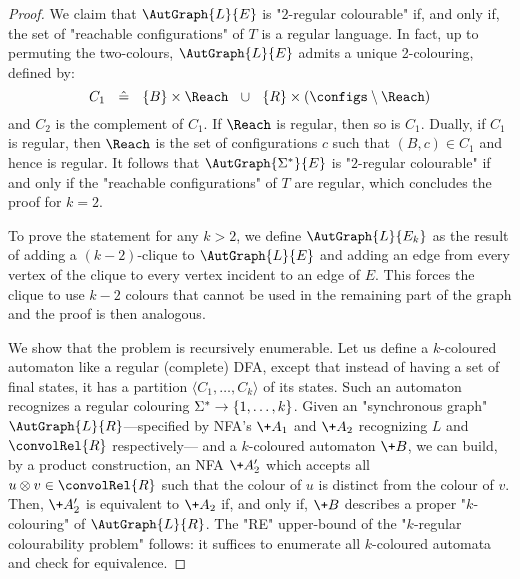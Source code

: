 \begin{proof}
    We claim that $\AutGraph{L}{E}$ is "$2$-regular colourable" if, and only if, the set of "reachable configurations" of $T$ is a regular language. 
    In fact, up to permuting the two-colours, 
  $\AutGraph{L}{E}$ admits a unique 2-colouring, defined by:
    \[
        C_1 ~~ \defeq ~~ \{B\} \times \Reach ~~\cup~~ \{R\} \times (\configs \setminus \Reach)
    \]
    and $C_2$ is the complement of $C_1$.
    If $\Reach$ is regular, then so is $C_1$. Dually, if $C_1$ is regular, then
    $\Reach$ is the set of configurations $c$ such that $(B,c) \in C_1$ and hence is regular.
    It follows that $\AutGraph{\Sigma^*}{E}$ is "$2$-regular colourable" if and only if
    the "reachable configurations" of $T$ are regular, which concludes the proof for $k=2$.



    To prove the statement for any $k>2$, we define $\AutGraph{L}{E_k}$ as the result of adding a $(k-2)$-clique to $\AutGraph{L}{E}$ and adding an edge from every vertex of the clique to every vertex incident to an edge of $E$. This forces the clique to use $k-2$ colours that cannot be used in the remaining part of the graph and the proof is then analogous.

	 We show that the problem is recursively enumerable. Let us define a $k$-coloured automaton like a regular (complete) DFA, except that instead of having
	a set of final states, it has a partition $\langle C_1,\hdots,C_k \rangle$ of its states.
	Such an automaton recognizes a regular colouring $\Sigma^* \to \{1, \dotsc, k\}$.
	Given an "synchronous graph" $\AutGraph{L}{R}$---specified by
	 NFA's $\+A_1$ and $\+A_2$ recognizing $L$ and $\convolRel{R}$  respectively--- and a $k$-coloured automaton $\+B$,
	we can build, by a product construction, an NFA $\+A'_2$  which accepts
	all $u \otimes v \in \convolRel{R}$ such that the colour of $u$ is distinct from the colour of $v$.
	Then, $\+A'_2$ is equivalent to $\+A_2$ if, and only if, $\+B$ describes a proper "$k$-colouring" 
	of $\AutGraph{L}{R}$. The "RE" upper-bound of the "$k$-regular colourability problem" follows: it 
	suffices to enumerate all $k$-coloured automata and check for equivalence.
\end{proof}

